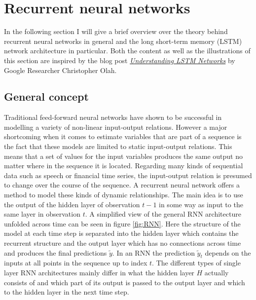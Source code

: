 \chapter{Recurrent neural networks}\label{Sec:Method}
In the following section I will give a brief overview over the theory behind recurrent neural networks in general and the long short-term memory (LSTM) network architecture in particular. Both the content as well as the illustrations of this section are inspired by the blog post \href{http://colah.github.io/posts/2015-08-Understanding-LSTMs/}{\textit{Understanding LSTM Networks}} by Google Researcher Christopher Olah.
\section{General concept}
Traditional feed-forward neural networks have shown to be successful in modelling a variety of non-linear input-output relations. However a major shortcoming when it comes to estimate variables that are part of a sequence is the fact that these models are limited to static input-output relations. This means that a set of values for the input variables produces the same output no matter where in the sequence it is located. Regarding many kinds of sequential data such as speech or financial time series, the input-output relation is presumed to change over the course of the sequence. A recurrent neural network offers a method to model these kinds of dynamic relationships. The main idea is to use the output of the hidden layer of observation $t-1$ in some way as input to the same layer in observation $t$. A simplified view of the general RNN architecture unfolded across time can be seen in figure \ref{fig:RNN}. Here the structure of the model at each time step is separated into the hidden layer which contains the recurrent structure and the output layer which has no connections across time and produces the final predictions $\tilde{y}$. In an RNN the prediction $\tilde{y}_t$ depends on the inputs at all points in the sequence up to index $t$.
The different types of single layer RNN architectures mainly differ in what the hidden layer $H$ actually consists of and which part of its output is passed to the output layer and which to the hidden layer in the next time step. 
